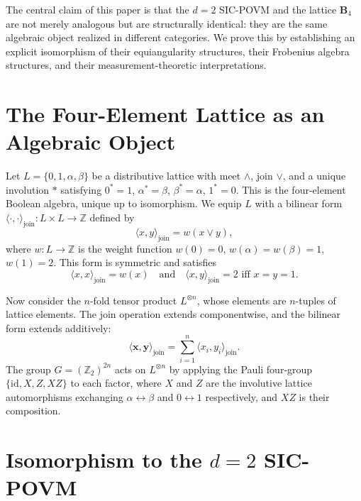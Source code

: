 \documentclass{article}
\begin{document}
The central claim of this paper is that the $d=2$ SIC-POVM and the lattice $\mathbf{B}_4$ are not merely analogous but are structurally identical: they are the same algebraic object realized in different categories. We prove this by establishing an explicit isomorphism of their equiangularity structures, their Frobenius algebra structures, and their measurement-theoretic interpretations.

\section{The Four-Element Lattice as an Algebraic Object}

Let $L = \{0, 1, \alpha, \beta\}$ be a distributive lattice with meet $\wedge$, join $\vee$, and a unique involution $*$ satisfying $0^* = 1$, $\alpha^* = \beta$, $\beta^* = \alpha$, $1^* = 0$. This is the four-element Boolean algebra, unique up to isomorphism. We equip $L$ with a bilinear form $\langle \cdot, \cdot \rangle_{\text{join}} : L \times L \to \mathbb{Z}$ defined by
\begin{equation}
\langle x, y \rangle_{\text{join}} = w(x \vee y),
\end{equation}
where $w: L \to \mathbb{Z}$ is the weight function $w(0)=0$, $w(\alpha)=w(\beta)=1$, $w(1)=2$. This form is symmetric and satisfies
\begin{equation}
\langle x, x \rangle_{\text{join}} = w(x) \quad \text{and} \quad \langle x, y \rangle_{\text{join}} = 2 \text{ iff } x = y = 1.
\end{equation}

Now consider the $n$-fold tensor product $L^{\otimes n}$, whose elements are $n$-tuples of lattice elements. The join operation extends componentwise, and the bilinear form extends additively:
\begin{equation}
\langle \mathbf{x}, \mathbf{y} \rangle_{\text{join}} = \sum_{i=1}^n \langle x_i, y_i \rangle_{\text{join}}.
\end{equation}
The group $G = (\mathbb{Z}_2)^{2n}$ acts on $L^{\otimes n}$ by applying the Pauli four-group $\{\mathrm{id}, X, Z, XZ\}$ to each factor, where $X$ and $Z$ are the involutive lattice automorphisms exchanging $\alpha \leftrightarrow \beta$ and $0 \leftrightarrow 1$ respectively, and $XZ$ is their composition.

\section{Isomorphism to the $d=2$ SIC-POVM}
\end{document}
